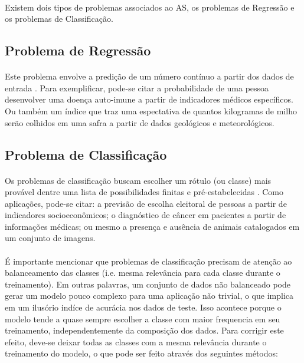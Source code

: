 \paragraph{} Existem dois tipos de problemas associados ao AS, os problemas de Regressão e os problemas de Classificação.


\subsection{Problema de Regressão}

\paragraph{} Este problema envolve a predição de um número contínuo a partir dos dados de entrada \cite{muller2016introduction}. Para exemplificar, pode-se citar a probabilidade de uma pessoa desenvolver uma doença auto-imune a partir de indicadores médicos específicos. Ou também um índice que traz uma espectativa de quantos kilogramas de milho serão colhidos em uma safra a partir de dados geológicos e meteorológicos.

\subsection{Problema de Classificação}

\paragraph{} Os problemas de classificação buscam escolher um rótulo (ou classe) mais provável dentre uma lista de possibilidades finitas e pré-estabelecidas \cite{muller2016introduction}. Como aplicações, pode-se citar: a previsão de escolha eleitoral de pessoas a partir de indicadores socioeconômicos; o diagnóstico de câncer em pacientes a partir de informações médicas; ou mesmo a presença e ausência de animais catalogados em um conjunto de imagens.

\paragraph{} É importante mencionar que problemas de classificação precisam de atenção ao balanceamento das classes (i.e. mesma relevância para cada classe durante o treinamento). Em outras palavras, um conjunto de dados não balanceado pode gerar um modelo pouco complexo para uma aplicação não trivial, o que implica em um ilusório indíce de acurácia nos dados de teste. Isso acontece porque o modelo tende a quase sempre escolher a classe com maior frequencia em seu treinamento, independentemente da composição dos dados. Para corrigir este efeito, deve-se deixar todas as classes com a mesma relevância durante o treinamento do modelo, o que pode ser feito através dos seguintes métodos:

